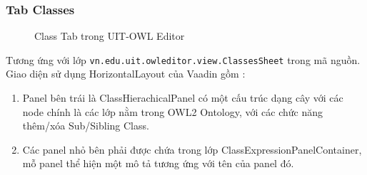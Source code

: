 \subsubsection{Tab Classes} 
\begin{figure}[h!]
	\centering
	\caption{Class Tab trong UIT-OWL Editor\label{overflow}}
\end{figure}
Tương ứng với lớp \verb|vn.edu.uit.owleditor.view.ClassesSheet| trong mã nguồn. Giao diện sử dụng HorizontalLayout của Vaadin gồm :
\begin{enumerate}
\item Panel bên trái là ClassHierachicalPanel có một cấu trúc dạng cây với các node chính là các lớp nằm trong OWL2 Ontology, với các chức năng thêm/xóa Sub/Sibling Class.
\item Các panel nhỏ bên phải được chứa trong lớp ClassExpressionPanelContainer, mỗ panel thể hiện một mô tả tương ứng với tên của panel đó.
\end{enumerate}	


